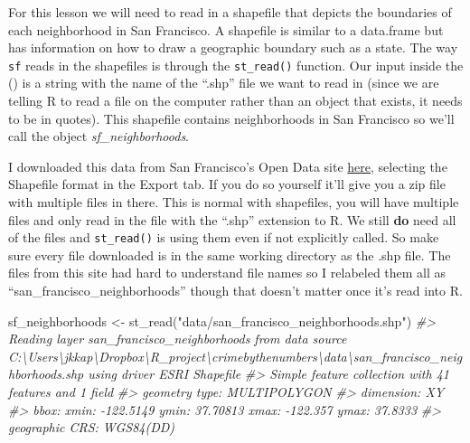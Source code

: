 \documentclass[
  12pt,
]{book}
\newenvironment{Shaded}{\begin{snugshade}}{\end{snugshade}}
\newcommand{\CommentTok}[1]{\textcolor[rgb]{0.37,0.37,0.37}{\textit{#1}}}
\newcommand{\FunctionTok}[1]{\textcolor[rgb]{0,0,0}{#1}}
\newcommand{\NormalTok}[1]{#1}
\newcommand{\OtherTok}[1]{\textcolor[rgb]{0.37,0.37,0.37}{#1}}
\newcommand{\StringTok}[1]{\textcolor[rgb]{0.5,0.5,0.5}{#1}}
\begin{document}
For this lesson we will need to read in a shapefile that depicts the boundaries of each neighborhood in San Francisco. A shapefile is similar to a data.frame but has information on how to draw a geographic boundary such as a state. The way \texttt{sf} reads in the shapefiles is through the \texttt{st\_read()} function. Our input inside the () is a string with the name of the ``.shp'' file we want to read in (since we are telling R to read a file on the computer rather than an object that exists, it needs to be in quotes). This shapefile contains neighborhoods in San Francisco so we'll call the object \emph{sf\_neighborhoods}.

I downloaded this data from San Francisco's Open Data site \href{https://data.sfgov.org/Geographic-Locations-and-Boundaries/Analysis-Neighborhoods/p5b7-5n3h}{here}, selecting the Shapefile format in the Export tab. If you do so yourself it'll give you a zip file with multiple files in there. This is normal with shapefiles, you will have multiple files and only read in the file with the ``.shp'' extension to R. We still \textbf{do} need all of the files and \texttt{st\_read()} is using them even if not explicitly called. So make sure every file downloaded is in the same working directory as the .shp file. The files from this site had hard to understand file names so I relabeled them all as ``san\_francisco\_neighborhoods'' though that doesn't matter once it's read into R.

\begin{Shaded}
\begin{Highlighting}[]
\NormalTok{sf\_neighborhoods }\OtherTok{\textless{}{-}} \FunctionTok{st\_read}\NormalTok{(}\StringTok{"data/san\_francisco\_neighborhoods.shp"}\NormalTok{)}
\CommentTok{\#\textgreater{} Reading layer \textasciigrave{}san\_francisco\_neighborhoods\textquotesingle{} from data source \textasciigrave{}C:\textbackslash{}Users\textbackslash{}jkkap\textbackslash{}Dropbox\textbackslash{}R\_project\textbackslash{}crimebythenumbers\textbackslash{}data\textbackslash{}san\_francisco\_neighborhoods.shp\textquotesingle{} using driver \textasciigrave{}ESRI Shapefile\textquotesingle{}}
\CommentTok{\#\textgreater{} Simple feature collection with 41 features and 1 field}
\CommentTok{\#\textgreater{} geometry type:  MULTIPOLYGON}
\CommentTok{\#\textgreater{} dimension:      XY}
\CommentTok{\#\textgreater{} bbox:           xmin: {-}122.5149 ymin: 37.70813 xmax: {-}122.357 ymax: 37.8333}
\CommentTok{\#\textgreater{} geographic CRS: WGS84(DD)}
\end{Highlighting}
\end{Shaded}
\end{document}

